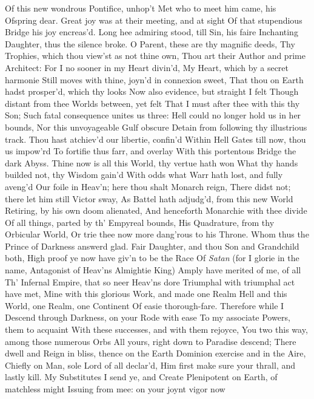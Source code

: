 \documentclass[11pt]{book}
\newcounter {first}
\newcounter {last}
\begin{document}
Of this new wondrous Pontifice, unhop't 
Met who to meet him came, his Ofspring dear. 
Great joy was at their meeting, and at sight 
Of that stupendious Bridge his joy encreas'd. 
Long hee admiring stood, till Sin, his faire 
Inchanting Daughter, thus the silence broke. 
\quad O Parent, these are thy magnific deeds, 
Thy Trophies, which thou view'st as not thine own, 
Thou art their Author and prime Architect: 
For I no sooner in my Heart divin'd, 
My Heart, which by a secret harmonie 
Still moves with thine, joyn'd in connexion sweet, 
That thou on Earth hadst prosper'd, which thy looks 
Now also evidence, but straight I felt 
Though distant from thee Worlds between, yet felt 
That I must after thee with this thy Son; 
Such fatal consequence unites us three: 
Hell could no longer hold us in her bounds, 
Nor this unvoyageable Gulf obscure 
Detain from following thy illustrious track. 
Thou hast atchiev'd our libertie, confin'd 
Within Hell Gates till now, thou us impow'rd 
To fortifie thus farr, and overlay 
With this portentous Bridge the dark Abyss. 
Thine now is all this World, thy vertue hath won 
What thy hands builded not, thy Wisdom gain'd 
With odds what Warr hath lost, and fully aveng'd 
Our foile in Heav'n; here thou shalt Monarch reign, 
There didst not; there let him still Victor sway, 
As Battel hath adjudg'd, from this new World 
Retiring, by his own doom alienated, 
And henceforth Monarchie with thee divide 
Of all things, parted by th' Empyreal bounds, 
His Quadrature, from thy Orbicular World, 
Or trie thee now more dang'rous to his Throne. 
\quad Whom thus the Prince of Darkness answerd glad. 
Fair Daughter, and thou Son and Grandchild both, 
High proof ye now have giv'n to be the Race 
Of \textit{Satan} (for I glorie in the name, 
Antagonist of Heav'ns Almightie King) 
Amply have merited of me, of all 
Th' Infernal Empire, that so neer Heav'ns dore 
Triumphal with triumphal act have met, 
Mine with this glorious Work, and made one Realm 
Hell and this World, one Realm, one Continent 
Of easie thorough-fare.  Therefore while I 
Descend through Darkness, on your Rode with ease 
To my associate Powers, them to acquaint 
With these successes, and with them rejoyce, 
You two this way, among those numerous Orbs 
All yours, right down to Paradise descend; 
There dwell and Reign in bliss, thence on the Earth 
Dominion exercise and in the Aire, 
Chiefly on Man, sole Lord of all declar'd, 
Him first make sure your thrall, and lastly kill. 
My Substitutes I send ye, and Create 
Plenipotent on Earth, of matchless might 
Issuing from mee: on your joynt vigor now 
\end{document}
